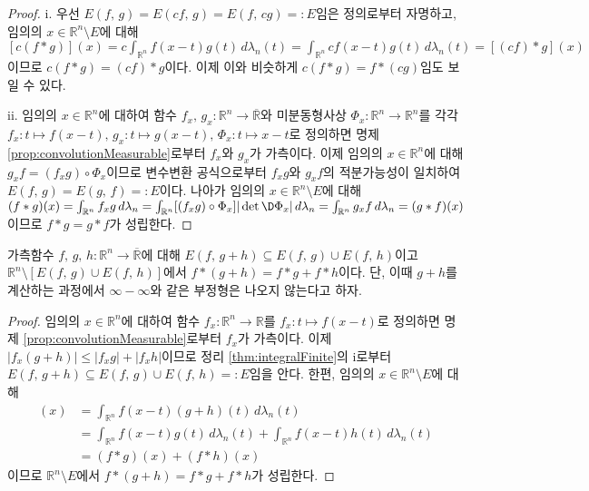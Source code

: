 \begin{proof}
    i. 우선 $E(f,\,g)=E(cf,\,g)=E(f,\,cg)=:E$임은 정의로부터 자명하고, 임의의 $x\in\mathbb{R}^n\setminus E$에 대해 $[c(f*g)](x)=c\int_{\mathbb{R}^n}f(x-t)g(t)\,d\lambda_n(t)=\int_{\mathbb{R}^n}cf(x-t)g(t)\,d\lambda_n(t)=[(cf)*g](x)$이므로 $c(f*g)=(cf)*g$이다. 이제 이와 비슷하게 $c(f*g)=f*(cg)$임도 보일 수 있다.

    ii. 임의의 $x\in\mathbb{R}^n$에 대하여 함수 $f_x,\,g_x:\mathbb{R}^n\to\overline{\mathbb{R}}$와 미분동형사상 $\Phi_x:\mathbb{R}^n\to\mathbb{R}^n$를 각각 $f_x:t\mapsto f(x-t),\,g_x:t\mapsto g(x-t),\,\Phi_x:t\mapsto x-t$로 정의하면 명제 \ref{prop:convolutionMeasurable}로부터 $f_x$와 $g_x$가 가측이다. 이제 임의의 $x\in\mathbb{R}^n$에 대해 $g_xf=(f_xg)\circ\Phi_x$이므로 변수변환 공식으로부터 $f_xg$와 $g_xf$의 적분가능성이 일치하여 $E(f,\,g)=E(g,\,f)=:E$이다. 나아가 임의의 $x\in\mathbb{R}^n\setminus E$에 대해 $(f*g)(x)=\int_{\mathbb{R}^n}f_xg\,d\lambda_n=\int_{\mathbb{R}^n}[(f_xg)\circ\Phi_x]|\det\D\Phi_x|\,d\lambda_n=\int_{\mathbb{R}^n}g_xf\,d\lambda_n=(g*f)(x)$이므로 $f*g=g*f$가 성립한다.
\end{proof}

\begin{theorem}\label{thm:convolutionDist}
    가측함수 $f,\,g,\,h:\mathbb{R}^n\to\overline{\mathbb{R}}$에 대해 $E(f,\,g+h)\subseteq E(f,\,g)\cup E(f,\,h)$이고 $\mathbb{R}^n\setminus[E(f,\,g)\cup E(f,\,h)]$에서 $f*(g+h)=f*g+f*h$이다. 단, 이때 $g+h$를 계산하는 과정에서 $\infty-\infty$와 같은 부정형은 나오지 않는다고 하자.
\end{theorem}

\begin{proof}
    임의의 $x\in\mathbb{R}^n$에 대하여 함수 $f_x:\mathbb{R}^n\to\mathbb{R}$를 $f_x:t\mapsto f(x-t)$로 정의하면 명제 \ref{prop:convolutionMeasurable}로부터 $f_x$가 가측이다. 이제 $|f_x(g+h)|\leq|f_xg|+|f_xh|$이므로 정리 \ref{thm:integralFinite}의 i로부터 $E(f,\,g+h)\subseteq E(f,\,g)\cup E(f,\,h)=:E$임을 안다. 한편, 임의의 $x\in\mathbb{R}^n\setminus E$에 대해
    \begin{align*}
        [f*(g+h)](x)&=\int_{\mathbb{R}^n}f(x-t)(g+h)(t)\,d\lambda_n(t)\\
        &=\int_{\mathbb{R}^n}f(x-t)g(t)\,d\lambda_n(t)+\int_{\mathbb{R}^n}f(x-t)h(t)\,d\lambda_n(t)\\
        &=(f*g)(x)+(f*h)(x)
    \end{align*}
    이므로 $\mathbb{R}^n\setminus E$에서 $f*(g+h)=f*g+f*h$가 성립한다.
\end{proof}

